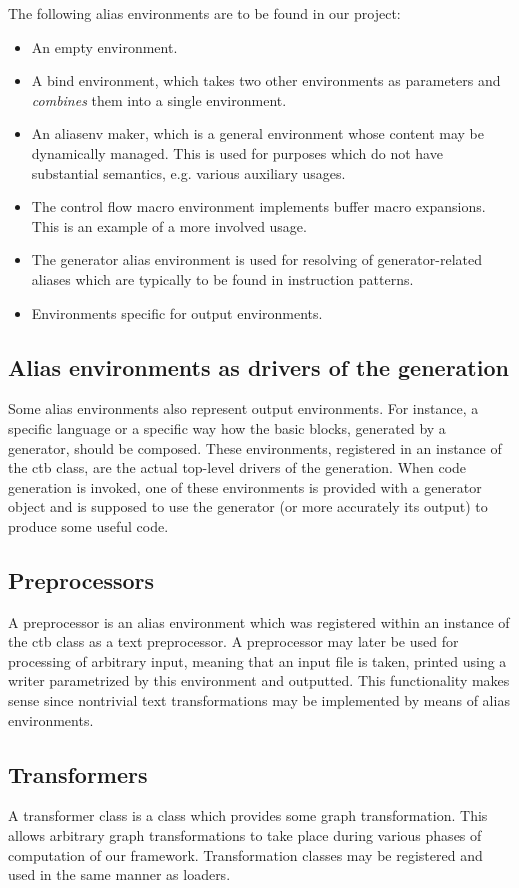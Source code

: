 The following alias environments are to be found in our project:
\begin{itemize}
  \item An empty environment.
  \item A bind environment, which takes two other environments as parameters and \emph{combines} them into a single environment.
  \item An aliasenv maker, which is a general environment whose content may be dynamically managed. This is used for purposes which do not have substantial semantics, e.g. various auxiliary usages. 
  \item The control flow macro environment implements buffer macro expansions. This is an example of a more involved usage.
  \item The generator alias environment is used for resolving of generator-related aliases which are typically to be found in instruction patterns.
  \item Environments specific for output environments.
\end{itemize}

\subsection*{Alias environments as drivers of the generation}
  Some alias environments also represent output environments. For instance, a specific language or a specific way how the basic blocks, generated by a generator, should be composed. These environments, registered in an instance of the ctb class, are the actual top-level drivers of the generation. When code generation is invoked, one of these environments is provided with a generator object and is supposed to use the generator (or more accurately its output) to produce some useful code. 

\subsection*{Preprocessors}
  A preprocessor is an alias environment which was registered within an instance of the ctb class as a text preprocessor. A preprocessor may later be used for processing of arbitrary input, meaning that an input file is taken, printed using a writer parametrized by this environment and outputted. This functionality makes sense since nontrivial text transformations may be implemented by means of alias environments.

\subsection*{Transformers}
  A transformer class is a class which provides some graph transformation. This allows arbitrary graph transformations to take place during various phases of computation of our framework. Transformation classes may be registered and used in the same manner as loaders.

